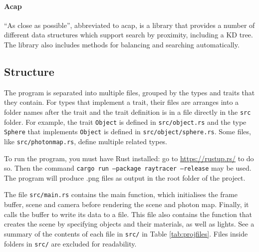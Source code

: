 \documentclass[a4paper]{article}
\begin{document}
\paragraph{Acap} ``As close as possible'', abbreviated to acap, is a library that provides a number of different data structures which support search by proximity, including a KD tree. The library also includes methods for balancing and searching automatically.

\subsection{Structure}
The program is separated into multiple files, grouped by the types and traits that they contain. For types that implement a trait, their files are arranges into a folder names after the trait and the trait definition is in a file directly in the \texttt{src} folder. For example, the trait \texttt{Object} is defined in \texttt{src/object.rs} and the type \texttt{Sphere} that implements \texttt{Object} is defined in \texttt{src/object/sphere.rs}. Some files, like \texttt{src/photonmap.rs}, define multiple related types.

To run the program, you must have Rust installed: go to \url{https://rustup.rs/} to do so. Then the command \texttt{cargo run --package raytracer --release} may be used. The program will produce .png files as output in the root folder of the project.

The file \texttt{src/main.rs} contains the main function, which initialises the frame buffer, scene and camera before rendering the scene and photon map. Finally, it calls the buffer to write its data to a file. This file also contains the function that creates the scene by specifying objects and their materials, as well as lights. See a summary of the contents of each file in \texttt{src/} in Table \ref{tab:projfiles}. Files inside folders in \texttt{src/} are excluded for readability.
\end{document}
